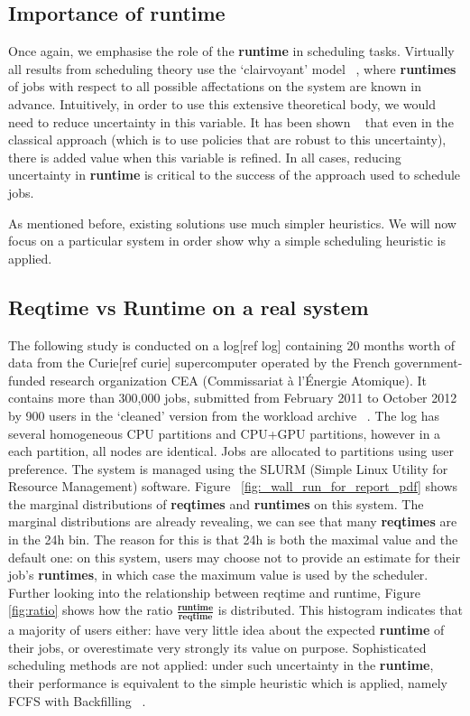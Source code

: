 \documentclass{article}
\begin{document}
\subsection{Importance of \textbf{runtime}}
\label{sub:importance_of_runtime}
Once again, we emphasise the role of the \textbf{runtime} in scheduling tasks. Virtually all results from scheduling theory use the `clairvoyant' model ~\cite{handbook-of-scheduling}, where \textbf{runtimes} of jobs with respect to all possible affectations on the system are known in advance.
Intuitively, in order to use this extensive theoretical body, we would need to reduce uncertainty in this variable.
It has been shown  ~\cite{tsafir} that even in the classical approach (which is to use policies that are robust to this uncertainty), there is added value when this variable is refined.
In all cases, reducing uncertainty in \textbf{runtime} is critical to the success of the approach used to schedule jobs.

As mentioned before, existing solutions use much simpler heuristics. We will now focus on a particular system in order show why a simple scheduling heuristic is applied.

\subsection{Reqtime vs Runtime on a real system}
\label{sub:reqtime_vs_runtime_on_a_real_system}
The following study is conducted on a log[ref log] containing 20 months worth of data from the Curie[ref curie] supercomputer operated by the French government-funded research organization CEA (Commissariat à l'Énergie Atomique).
It contains more than 300,000 jobs, submitted from February 2011 to October 2012 by 900 users in the `cleaned' version from the workload archive ~\cite{workloadarchive}.
The log has several homogeneous CPU partitions and CPU+GPU partitions, however in a each partition, all nodes are identical.
Jobs are allocated to partitions using user preference. The system is managed using the SLURM (Simple Linux Utility for Resource Management) software.
Figure ~\ref{fig:_wall_run_for_report_pdf} shows the marginal distributions of \textbf{reqtimes} and \textbf{runtimes} on this system. The marginal distributions are already revealing, we can see that many \textbf{reqtimes} are in the 24h bin.
The reason for this is that 24h is both the maximal value and the default one: on this system, users may choose not to provide an estimate for their job's \textbf{runtimes}, in which case the maximum value is used by the scheduler.
Further looking into the relationship between reqtime and runtime, Figure~ \ref{fig:ratio} shows how the ratio $\frac{\textbf{runtime}}{\textbf{reqtime}}$ is distributed. This histogram indicates that a majority of users either: have very little idea about the expected \textbf{runtime} of their jobs, or overestimate very strongly its value on purpose. Sophisticated scheduling methods are not applied: under such uncertainty in the \textbf{runtime},  their performance is equivalent to the simple heuristic which is applied, namely FCFS with Backfilling ~\cite{backfilling}.
\end{document}
